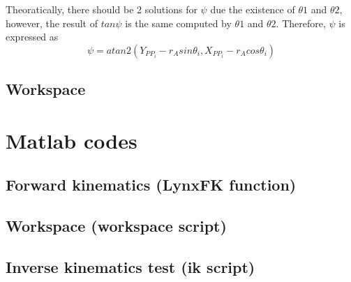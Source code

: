 \documentclass{article}
\begin{document}
Theoratically, there should be 2 solutions for $\psi$ due the existence of $\theta1$ and $\theta2$, however, the result of $tan\psi$ is the same computed by $\theta1$ and $\theta2$. Therefore, $\psi$ is expressed as
\begin{equation}
\psi = atan2(Y_{PP_i}-r_Asin\theta_i,X_{PP_i}-r_Acos\theta_i )
\end{equation}

\subsection{Workspace}

\appendix
\section{Matlab codes}
\subsection{Forward kinematics (LynxFK function)}
\label{apendix:LynxFK}


\subsection{Workspace (workspace script)}
\label{apendix:workspace}


\subsection{Inverse kinematics test (ik script)}
\label{apendix:ik_test}





%
\end{document}
